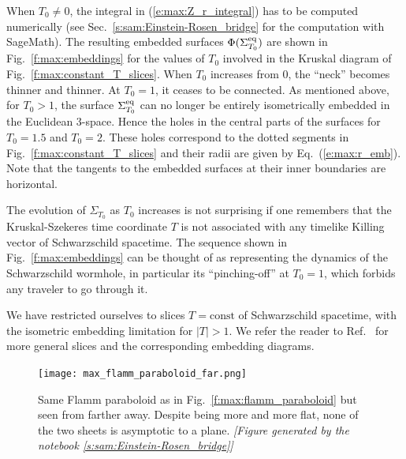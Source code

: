 When $T_0\not=0$, the integral in (\ref{e:max:Z_r_integral}) has to
be computed numerically (see Sec.~\ref{s:sam:Einstein-Rosen_bridge} for the computation with SageMath).
The resulting embedded surfaces $\Phi(\Sigma_{T_0}^{\rm eq})$ are shown in
Fig.~\ref{f:max:embeddings} for the values of $T_0$ involved in the
Kruskal diagram of Fig.~\ref{f:max:constant_T_slices}.
When $T_0$ increases from $0$, the ``neck'' becomes thinner and thinner.
At $T_0=1$, it ceases to be connected. As mentioned above, for $T_0 > 1$,
the surface $\Sigma_{T_0}^{\rm eq}$ can no longer be entirely
isometrically embedded in the Euclidean 3-space. Hence the holes in the central
parts of the surfaces for $T_0=1.5$ and $T_0=2$. These holes correspond
to the dotted segments in Fig.~\ref{f:max:constant_T_slices} and their radii
are given by Eq.~(\ref{e:max:r_emb}). Note that the tangents to the
embedded surfaces at their inner boundaries are horizontal.

The evolution of $\Sigma_{T_0}$ as $T_0$ increases is not surprising if one
remembers that the Kruskal-Szekeres time coordinate $T$ is not associated
with any timelike Killing vector of Schwarzschild spacetime.
The sequence shown in Fig.~\ref{f:max:embeddings} can be thought of as
representing the dynamics of the Schwarzschild wormhole, in particular
its ``pinching-off'' at $T_0=1$, which forbids any traveler to go through it.

\begin{remark}
We have restricted ourselves to slices $T=\mathrm{const}$ of Schwarzschild
spacetime, with the isometric embedding limitation for $|T|>1$. We refer the
reader to Ref.~\cite{CollaK12} for more general slices and the corresponding
embedding diagrams.
\end{remark}

\begin{figure}
\centerline{\texttt{[image: max\_flamm\_paraboloid\_far.png]}}
\caption[]{\label{f:max:flamm_paraboloid_far} \footnotesize
Same Flamm paraboloid as in Fig.~\ref{f:max:flamm_paraboloid}
but seen from farther away. Despite being more and more flat, none of the two sheets
is asymptotic to a plane.
\textsl{[Figure generated by the notebook \ref{s:sam:Einstein-Rosen_bridge}]}
}
\end{figure}

